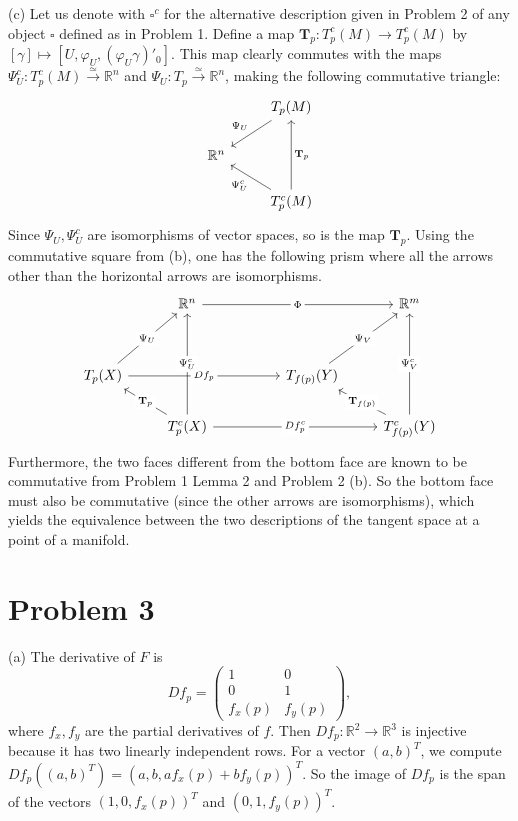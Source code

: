 \documentclass{amsart}
\numberwithin{equation}{section}
\theoremstyle{plain}
\theoremstyle{definition}
\theoremstyle{remark}
\renewcommand{\_}[2]{\underbrace{#1}_{#2}}
\renewcommand{\^}[2]{\overbrace{#1}_{#2}}
\newcommand{\R}{\mathbb{R}}
\newcommand{\Tau}{\mathbf{T}}
\begin{document}
(c) Let us denote with $\square^c$ for the alternative description given in Problem 2 of any object $\square$ defined as in Problem 1. Define a map $\Tau_p: T_p^c(M) \to T_p^c(M)$ by $[\gamma] \mapsto [U, \varphi_U, (\varphi_U \gamma)'_0]$. This map clearly commutes with the maps $\Psi^c_U: T_p^c(M) \xrightarrow{\simeq} \R^n$ and $\Psi_U: T_p \xrightarrow{\simeq} \R^n$, making the following commutative triangle:
\[\begin{tikzcd}
	& {T_p(M)} \\
	{\R^n} \\
	& {T_p^c(M)}
	\arrow["{\Psi_U}"', from=1-2, to=2-1]
	\arrow["\Tau_p"', from=3-2, to=1-2]
	\arrow["{\Psi_U^c}", from=3-2, to=2-1]
      \end{tikzcd}\]
    Since $\Psi_U, \Psi_U^c$ are isomorphisms of vector spaces, so is the map $\Tau_p$. Using the commutative square from (b), one has the following prism where all the arrows other than the horizontal arrows are isomorphisms. 
\[\begin{tikzcd}
	& {\R^n} &&& {\R^m} \\
	\\
	{T_p(X)} &&& {T_{f(p)}(Y)} \\
	& {T_p^c(X)} &&& {T_{f(p)}^c(Y)}
	\arrow["\Phi"{description}, from=1-2, to=1-5]
	\arrow["{\Psi_U}"{description}, from=3-1, to=1-2]
	\arrow["{Df_p}"{description}, from=3-1, to=3-4]
	\arrow["{\Psi_V}"{description}, from=3-4, to=1-5]
	\arrow["{\Psi_U^c}"{description}, from=4-2, to=1-2]
	\arrow["{\Tau_p}"{description}, from=4-2, to=3-1]
	\arrow["{Df_p^c}"{description}, from=4-2, to=4-5]
	\arrow["{\Psi_V^c}"{description}, from=4-5, to=1-5]
	\arrow["{\Tau_{f(p)}}"{description}, from=4-5, to=3-4]
      \end{tikzcd}\]
    Furthermore, the two faces different from the bottom face are known to be commutative from Problem 1 Lemma 2 and Problem 2 (b). So the bottom face must also be commutative (since the other arrows are isomorphisms), which yields the equivalence between the two descriptions of the tangent space at a point of a manifold.


\section*{Problem 3}
(a) The derivative of $F$ is $$Df_p =
\begin{pmatrix}
  1 & 0 \\ 0 & 1 \\ f_x(p) & f_y(p)
\end{pmatrix},$$ where $f_x,f_y$ are the partial derivatives of $f$. Then $Df_p:\R^2 \to \R^3$ is injective because it has two linearly independent rows. For a vector $(a,b)^T$, we compute $Df_p((a,b)^T) = (a,b,af_x(p) + bf_y(p))^T$. So the image of $Df_p$ is the span of the vectors $(1,0,f_x(p))^T$ and $(0,1,f_y(p))^T$. \\
\end{document}
